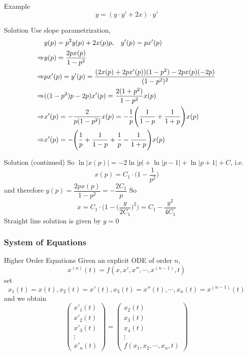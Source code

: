\documentclass{beamer}
\begin{document}
\begin{frame}
\begin{block}{Example}
$$y=(y\cdot y'+2x)\cdot y'$$
\end{block}
\end{frame}

\begin{frame}
\begin{block}{Solution}
Use slope parametrization,
\begin{align*}
&y(p)=p^2y(p)+2x(p)p,\hspace{3mm}y'(p)=px'(p)\\
\Rightarrow&y(p)=\dfrac{2px(p)}{1-p^2}\\
\Rightarrow&px'(p)=y'(p)=\dfrac{(2x(p)+2px'(p))(1-p^2)-2px(p)(-2p)}{(1-p^2)^2}\\
\Rightarrow&((1-p^2)p-2p)x'(p)=\dfrac{2(1+p^2)}{1-p^2}x(p)\\
\Rightarrow&x'(p)=-\dfrac{2}{p(1-p^2)}x(p)=-\dfrac{1}{p}\Bigg(\dfrac{1}{1-p}+\dfrac{1}{1+p}\Bigg)x(p)\\
\Rightarrow&x'(p)=-\Bigg(\dfrac{1}{p}+\dfrac{1}{1-p}+\dfrac{1}{p}-\dfrac{1}{1+p}\Bigg)x(p)
\end{align*}
\end{block}
\end{frame}
\begin{frame}
\begin{block}{Solution (continued)}
So $\ln|x(p)|=-2\ln|p|+\ln|p-1|+\ln|p+1|+C$, i.e.
$$x(p)=C_1\cdot\Bigg(1-\dfrac{1}{p^2}\Bigg)$$
and therefore $y(p)=\dfrac{2px(p)}{1-p^2}=-\dfrac{2C_1}{p}$
So
$$x=C_1\cdot\Bigg(1-\Big(\dfrac{y}{2C_1}\Big)^2\Bigg)=C_1-\dfrac{y^2}{4C_1}$$
Straight line solution is given by $y=0$
\end{block}
\end{frame}
\begin{frame}
\frametitle{System of Equations}
\begin{block}{Higher Order Equations}
Given an explicit ODE of order $n$,
$$x^{(n)}(t)=f(x,x',x'',\cdots,x^{(n-1)},t)$$
set
$$x_1(t)=x(t),x_2(t)=x'(t),x_3(t)=x''(t),\cdots,x_n(t)=x^{(n-1)}(t)$$
and we obtain
$$\begin{pmatrix}
x'_1(t)\\
x'_2(t)\\
x'_3(t)\\
\vdots\\
x'_n(t)
\end{pmatrix}=\begin{pmatrix}
x_2(t)\\
x_3(t)\\
x_4(t)\\
\vdots\\
f(x_1,x_2,\cdots,x_n,t)
\end{pmatrix} $$
\end{block}
\end{frame}
\end{document}
